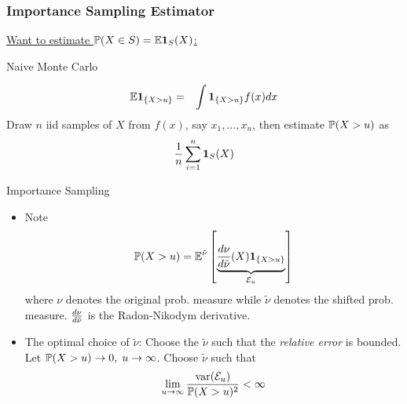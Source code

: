 \documentclass{beamer}
\begin{document}
\begin{frame}
  \frametitle{Importance Sampling Estimator}
  \underline{\scriptsize{
      Want to estimate $\P(X \in S) = \E \I_S(X)$:}
  }

  \begin{minipage}[t]{0.45\linewidth}
    \textcolor[HTML]{990033}{Naive Monte Carlo}
    \begin{small}
      \begin{eqnarray*}
        \E \1{X > u} &=& \int \1{X > u} f(x) dx
      \end{eqnarray*}
      Draw $n$ iid samples of $X$ from $f(x)$, say $x_1, ..., x_n$,
      then estimate $\P(X > u)$ as
      \[
      {1 \over n} \sum_{i=1}^n \I_S(X)
      \]
    \end{small}
  \end{minipage}\hfill
  \begin{minipage}[t]{0.5\linewidth}
    \textcolor[HTML]{990033}{Importance Sampling}
    \begin{scriptsize}
    \begin{itemize}
    \item Note
      \[
      \P(X > u)
      =
      \E^{\tilde \nu} \left[
        \underbrace{
          \td{\nu}{\tilde \nu}(X) \1{X > u}
        }_{\mathcal E_u}
      \right]
      \]
      where $\nu$ denotes the original prob. measure while $\tilde \nu$
      denotes the shifted prob. measure. $\td{\nu}{\tilde \nu}$ is the
      Radon-Nikodym derivative.
    \item The optimal choice of $\tilde \nu$:
      Choose the $\tilde \nu$ such that the {\em relative error}
      is bounded. Let $\P(X > u) \to 0,\; u \to \infty$. Choose
      $\tilde \nu$ such that
      \[
      \lim_{u \to \infty} {\var({\mathcal E}_u) \over \P(X > u)^2} < \infty
      \]
    \end{itemize}
    \end{scriptsize}
  \end{minipage}
\end{frame}
\end{document}
